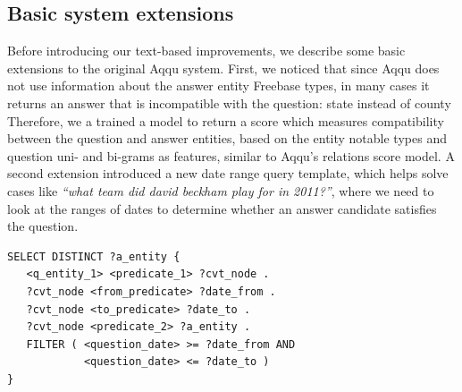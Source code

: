 \subsection{Basic system extensions}
\label{sec:baseline:extensions}
Before introducing our text-based improvements, we describe some basic extensions to the original Aqqu system.
First, we noticed that since Aqqu does not use information about the answer entity Freebase types, in many cases it returns an answer that is incompatible with the question: \eg state instead of county \etc
Therefore, we a trained a model to return a score which measures compatibility between the question and answer entities, based on the entity notable types and question uni- and bi-grams as features, similar to Aqqu's relations score model.
A second extension introduced a new date range query template, which helps solve cases like \textit{``what team did david beckham play for in 2011?''}, where we need to look at the ranges of dates to determine whether an answer candidate satisfies the question.

\begin{lstlisting}[frame=single,basicstyle=\small]
SELECT DISTINCT ?a_entity {
   <q_entity_1> <predicate_1> ?cvt_node .
   ?cvt_node <from_predicate> ?date_from .
   ?cvt_node <to_predicate> ?date_to .
   ?cvt_node <predicate_2> ?a_entity .
   FILTER ( <question_date> >= ?date_from AND
            <question_date> <= ?date_to )
}
\end{lstlisting}


